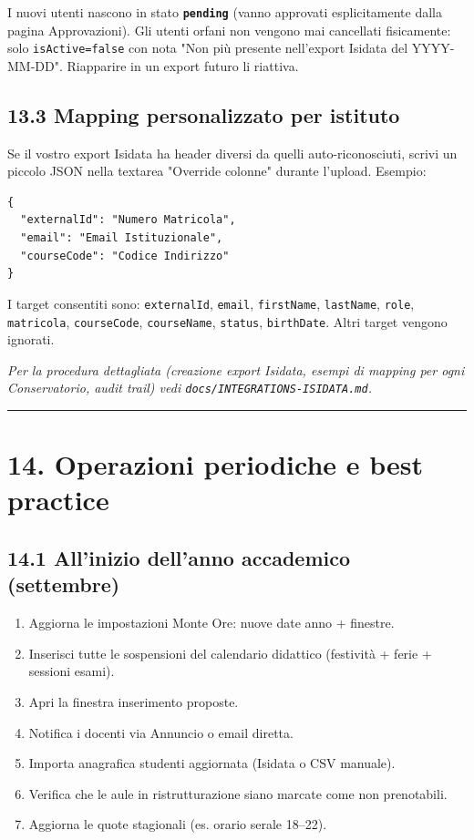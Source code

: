 \documentclass[11pt,a4paper]{article}
\renewenvironment{quote}
  {\begin{list}{}{%
      \setlength{\leftmargin}{8pt}%
      \setlength{\rightmargin}{8pt}%
      \setlength{\topsep}{6pt}%
      \setlength{\parsep}{0pt}}%
      \item\relax\color{black!75}\itshape}
  {\end{list}}
\begin{document}
I nuovi utenti nascono in stato \textbf{\texttt{pending}} (vanno approvati esplicitamente dalla pagina Approvazioni). Gli utenti orfani non vengono mai cancellati fisicamente: solo \texttt{isActive=false} con nota "Non più presente nell'export Isidata del YYYY-MM-DD". Riapparire in un export futuro li riattiva.

\subsection{13.3 Mapping personalizzato per istituto}


Se il vostro export Isidata ha header diversi da quelli auto-riconosciuti, scrivi un piccolo JSON nella textarea "Override colonne" durante l'upload. Esempio:

\begin{lstlisting}
{
  "externalId": "Numero Matricola",
  "email": "Email Istituzionale",
  "courseCode": "Codice Indirizzo"
}
\end{lstlisting}

I target consentiti sono: \texttt{externalId}, \texttt{email}, \texttt{firstName}, \texttt{lastName}, \texttt{role}, \texttt{matricola}, \texttt{courseCode}, \texttt{courseName}, \texttt{status}, \texttt{birthDate}. Altri target vengono ignorati.

\begin{quote}
Per la procedura dettagliata (creazione export Isidata, esempi di mapping per ogni Conservatorio, audit trail) vedi \texttt{docs/INTEGRATIONS-ISIDATA.md}.
\end{quote}

\medskip\hrule\medskip

\section{14. Operazioni periodiche e best practice}


\subsection{14.1 All'inizio dell'anno accademico (settembre)}


\begin{enumerate}
  \item Aggiorna le impostazioni Monte Ore: nuove date anno + finestre.
  \item Inserisci tutte le sospensioni del calendario didattico (festività + ferie + sessioni esami).
  \item Apri la finestra inserimento proposte.
  \item Notifica i docenti via Annuncio o email diretta.
  \item Importa anagrafica studenti aggiornata (Isidata o CSV manuale).
  \item Verifica che le aule in ristrutturazione siano marcate come non prenotabili.
  \item Aggiorna le quote stagionali (es. orario serale 18--22).
\end{enumerate}
\end{document}
